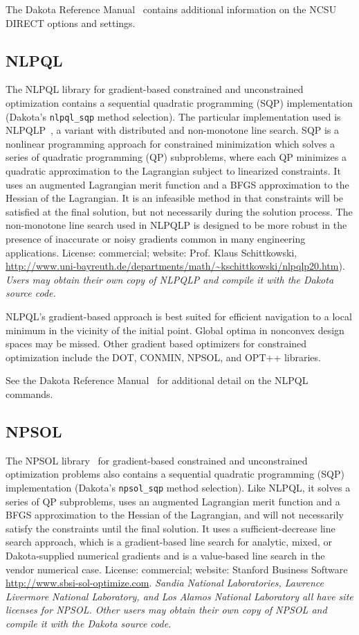 The Dakota Reference Manual~\cite{RefMan} contains additional
information on the NCSU DIRECT options and settings.

\subsection{NLPQL}\label{opt:software:nlpql}

The NLPQL library for gradient-based constrained and unconstrained
optimization contains a sequential quadratic programming (SQP)
implementation (Dakota's \texttt{nlpql\_sqp} method selection). The
particular implementation used is NLPQLP~\cite{Sch04}, a variant with
distributed and non-monotone line search. SQP is a nonlinear
programming approach for constrained minimization which solves a
series of quadratic programming (QP) subproblems, where each QP
minimizes a quadratic approximation to the Lagrangian subject to
linearized constraints. It uses an augmented Lagrangian merit function
and a BFGS approximation to the Hessian of the Lagrangian. It is an
infeasible method in that constraints will be satisfied at the final
solution, but not necessarily during the solution process. The
non-monotone line search used in NLPQLP is designed to be more robust
in the presence of inaccurate or noisy gradients common in many
engineering applications. License: commercial; website: Prof. Klaus
Schittkowski,
\url{http://www.uni-bayreuth.de/departments/math/~kschittkowski/nlpqlp20.htm}).
\emph{Users may obtain their own copy of NLPQLP and compile it with
  the Dakota source code.}

NLPQL's gradient-based approach is best suited for efficient
navigation to a local minimum in the vicinity of the initial point.
Global optima in nonconvex design spaces may be missed. Other gradient
based optimizers for constrained optimization include the DOT, CONMIN,
NPSOL, and OPT++ libraries.

See the Dakota Reference Manual~\cite{RefMan} for additional detail on
the NLPQL commands. 

\subsection{NPSOL}\label{opt:software:npsol}

The NPSOL library~\cite{Gil86} for gradient-based constrained and
unconstrained optimization problems also contains a sequential
quadratic programming (SQP) implementation (Dakota's
\texttt{npsol\_sqp} method selection). Like NLPQL, it solves a series
of QP subproblems, uses an augmented Lagrangian merit function and a
BFGS approximation to the Hessian of the Lagrangian, and will not
necessarily satisfy the constraints until the final solution. It uses
a sufficient-decrease line search approach, which is a gradient-based
line search for analytic, mixed, or Dakota-supplied numerical
gradients and is a value-based line search in the vendor numerical
case. License: commercial; website: Stanford Business Software
\url{http://www.sbsi-sol-optimize.com}. {\em Sandia National
  Laboratories, Lawrence Livermore National Laboratory, and Los Alamos
  National Laboratory all have site licenses for NPSOL. Other users
  may obtain their own copy of NPSOL and compile it with the Dakota
  source code.}

